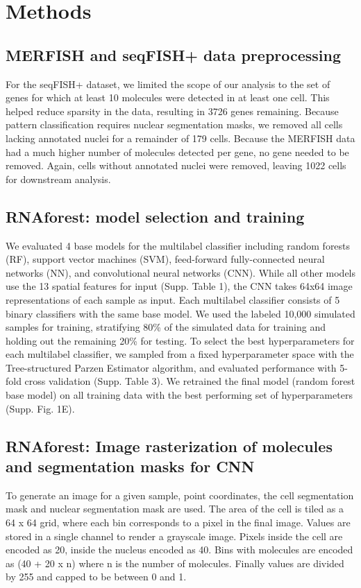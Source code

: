 \section{Methods}

\subsection{MERFISH and seqFISH+ data preprocessing}
For the seqFISH+ dataset, we limited the scope of our analysis to the set of genes for which at least 10 molecules were detected in at least one cell. This helped reduce sparsity in the data, resulting in 3726 genes remaining. Because pattern classification requires nuclear segmentation masks, we removed all cells lacking annotated nuclei for a remainder of 179 cells. Because the MERFISH data had a much higher number of molecules detected per gene, no gene needed to be removed. Again, cells without annotated nuclei were removed, leaving 1022 cells for downstream analysis.

\subsection{RNAforest: model selection and training}
We evaluated 4 base models for the multilabel classifier including random forests (RF), support vector machines (SVM), feed-forward fully-connected neural networks (NN), and convolutional neural networks (CNN). While all other models use the 13 spatial features for input (Supp. Table 1), the CNN takes 64x64 image representations of each sample as input. Each multilabel classifier consists of 5 binary classifiers with the same base model. We used the labeled 10,000 simulated samples for training, stratifying 80\% of the simulated data for training and holding out the remaining 20\% for testing. To select the best hyperparameters for each multilabel classifier, we sampled from a fixed hyperparameter space with the Tree-structured Parzen Estimator algorithm, and evaluated performance with 5-fold cross validation (Supp. Table 3). We retrained the final model (random forest base model) on all training data with the best performing set of hyperparameters (Supp. Fig. 1E).

\subsection{RNAforest: Image rasterization of molecules and segmentation masks for CNN}
To generate an image for a given sample, point coordinates, the cell segmentation mask and nuclear segmentation mask are used. The area of the cell is tiled as a 64 x 64 grid, where each bin corresponds to a pixel in the final image. Values are stored in a single channel to render a grayscale image. Pixels inside the cell are encoded as 20, inside the nucleus encoded as 40. Bins with molecules are encoded as (40 + 20 x n) where n is the number of molecules. Finally values are divided by 255 and capped to be between 0 and 1.

